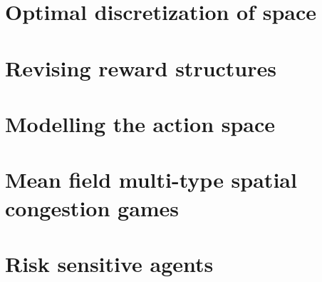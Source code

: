 \section{Optimal discretization of space}
\section{Revising reward structures}
\section{Modelling the action space}
\section{Mean field multi-type spatial congestion games}
\section{Risk sensitive agents}